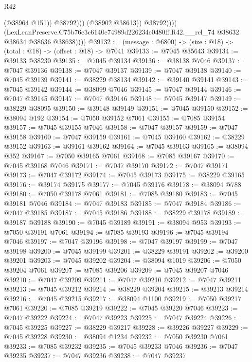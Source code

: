 \begin{lexlean}{R42}
\begin{coremodule}
{                            (@38964 @151))
                          @38792)))
                    (@38902 @38613))
                  @38792))))
          (LexLeanPreserve.C75b76e3c6140e74989d226234e0480ff.R42.__rel_74
            @38632
            @38634
            @38636
            @38638))))
@39132 := (message : @6800) -> (size : @18) -> (total : @18) -> (offset : @18) -> @7041
@39133 := @7045 @35643
@39134 := @39133 @38230
@39135 := @7045 @39134
@39136 := @38138 @7046
@39137 := @7047 @39136
@39138 := @7047 @39137
@39139 := @7047 @39138
@39140 := @7045 @39139
@39141 := @38229 @38134
@39142 := @39140 @39141
@39143 := @7045 @39142
@39144 := @38099 @7046
@39145 := @7047 @39144
@39146 := @7047 @39145
@39147 := @7047 @39146
@39148 := @7045 @39147
@39149 := @38229 @38095
@39150 := @39148 @39149
@39151 := @7045 @39150
@39152 := @38094 @192
@39154 := @7050 @39152 @7061
@39155 := @7085 @39154
@39157 := @7045 @39155 @7046
@39158 := @7047 @39157
@39159 := @7047 @39158
@39160 := @7047 @39159
@39161 := @7045 @39160
@39162 := @38229 @39152
@39163 := @39161 @39162
@39164 := @7045 @39163
@39165 := @38094 @352
@39167 := @7050 @39165 @7061
@39168 := @7085 @39167
@39170 := @7045 @39168 @7046
@39171 := @7047 @39170
@39172 := @7047 @39171
@39173 := @7047 @39172
@39174 := @7045 @39173
@39175 := @38229 @39165
@39176 := @39174 @39175
@39177 := @7045 @39176
@39178 := @38094 @788
@39180 := @7050 @39178 @7061
@39181 := @7085 @39180
@39183 := @7045 @39181 @7046
@39184 := @7047 @39183
@39185 := @7047 @39184
@39186 := @7047 @39185
@39187 := @7045 @39186
@39188 := @38229 @39178
@39189 := @39187 @39188
@39190 := @7045 @39189
@39191 := @38094 @953
@39193 := @7050 @39191 @7061
@39194 := @7085 @39193
@39196 := @7045 @39194 @7046
@39197 := @7047 @39196
@39198 := @7047 @39197
@39199 := @7047 @39198
@39200 := @7045 @39199
@39201 := @38229 @39191
@39202 := @39200 @39201
@39203 := @7045 @39202
@39204 := @38094 @1019
@39206 := @7050 @39204 @7061
@39207 := @7085 @39206
@39209 := @7045 @39207 @7046
@39210 := @7047 @39209
@39211 := @7047 @39210
@39212 := @7047 @39211
@39213 := @7045 @39212
@39214 := @38229 @39204
@39215 := @39213 @39214
@39216 := @7045 @39215
@39217 := @38094 @1100
@39219 := @7050 @39217 @7061
@39220 := @7085 @39219
@39222 := @7045 @39220 @7046
@39223 := @7047 @39222
@39224 := @7047 @39223
@39225 := @7047 @39224
@39226 := @7045 @39225
@39227 := @38229 @39217
@39228 := @39226 @39227
@39229 := @7045 @39228
@39230 := @38094 @1234
@39232 := @7050 @39230 @7061
@39233 := @7085 @39232
@39235 := @7045 @39233 @7046
@39236 := @7047 @39235
@39237 := @7047 @39236
@39238 := @7047 @39237
}
\end{coremodule}
\end{lexlean}
